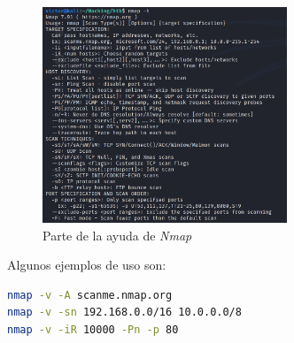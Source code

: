 \begin{figure}[h]
    \centering
    \includegraphics[width=0.65\textwidth]{images/sections/tools/nmap-help.png}
    \caption{Parte de la ayuda de \textit{Nmap}}
    \label{fig:nmap-help}
\end{figure}

Algunos ejemplos de uso son:

\begin{lstlisting}[language=bash]
nmap -v -A scanme.nmap.org
nmap -v -sn 192.168.0.0/16 10.0.0.0/8
nmap -v -iR 10000 -Pn -p 80
\end{lstlisting}